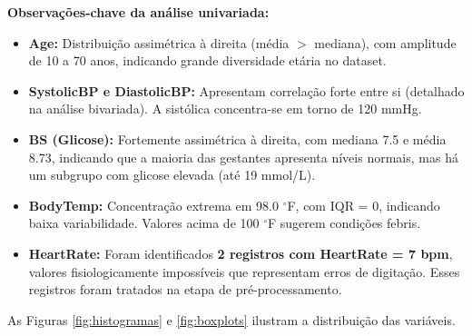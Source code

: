 \documentclass[12pt]{article}
\begin{document}
\begin{table}[H]
\centering
\caption{Estatísticas Descritivas das Variáveis Numéricas}
\label{tab:descritiva}
\end{table}

\textbf{Observações-chave da análise univariada:}
\begin{itemize}
    \item \textbf{Age:} Distribuição assimétrica à direita (média $>$ mediana), com amplitude de 10 a 70 anos, indicando grande diversidade etária no dataset.
    \item \textbf{SystolicBP e DiastolicBP:} Apresentam correlação forte entre si (detalhado na análise bivariada). A sistólica concentra-se em torno de 120 mmHg.
    \item \textbf{BS (Glicose):} Fortemente assimétrica à direita, com mediana 7.5 e média 8.73, indicando que a maioria das gestantes apresenta níveis normais, mas há um subgrupo com glicose elevada (até 19 mmol/L).
    \item \textbf{BodyTemp:} Concentração extrema em 98.0 $^\circ$F, com IQR = 0, indicando baixa variabilidade. Valores acima de 100 $^\circ$F sugerem condições febris.
    \item \textbf{HeartRate:} Foram identificados \textbf{2 registros com HeartRate = 7 bpm}, valores fisiologicamente impossíveis que representam erros de digitação. Esses registros foram tratados na etapa de pré-processamento.
\end{itemize}

As Figuras \ref{fig:histogramas} e \ref{fig:boxplots} ilustram a distribuição das variáveis.
\end{document}
